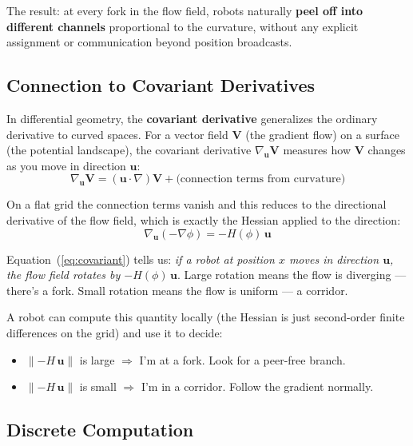 \documentclass[11pt]{article}
\begin{document}
The result: at every fork in the flow field, robots naturally
\textbf{peel off into different channels} proportional to the
curvature, without any explicit assignment or communication
beyond position broadcasts.

\subsection{Connection to Covariant Derivatives}

In differential geometry, the \textbf{covariant derivative}
generalizes the ordinary derivative to curved spaces.  For a
vector field $\mathbf{V}$ (the gradient flow) on a surface
(the potential landscape), the covariant derivative
$\nabla_{\mathbf{u}} \mathbf{V}$ measures how $\mathbf{V}$
changes as you move in direction $\mathbf{u}$:
\begin{equation}
    \nabla_{\mathbf{u}} \mathbf{V} = (\mathbf{u} \cdot \nabla)
    \mathbf{V} + \text{(connection terms from curvature)}
\end{equation}

On a flat grid the connection terms vanish and this reduces to the
directional derivative of the flow field, which is exactly the
Hessian applied to the direction:
\begin{equation}
    \nabla_{\mathbf{u}} (-\nabla\phi) = -H(\phi)\,\mathbf{u}
    \label{eq:covariant}
\end{equation}

Equation~(\ref{eq:covariant}) tells us: \emph{if a robot at
position $x$ moves in direction $\mathbf{u}$, the flow field
rotates by $-H(\phi)\,\mathbf{u}$}.  Large rotation means the
flow is diverging --- there's a fork.  Small rotation means the
flow is uniform --- a corridor.

A robot can compute this quantity locally (the Hessian is just
second-order finite differences on the grid) and use it to decide:
\begin{itemize}
    \item $\|{-H\,\mathbf{u}}\|$ is large $\Rightarrow$ I'm
    at a fork.  Look for a peer-free branch.
    \item $\|{-H\,\mathbf{u}}\|$ is small $\Rightarrow$ I'm
    in a corridor.  Follow the gradient normally.
\end{itemize}

\subsection{Discrete Computation}
\end{document}
